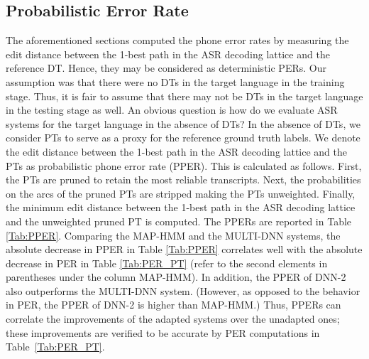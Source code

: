 \documentclass[a4paper]{article}
\begin{document}
\vspace{-1mm}
\subsection{Probabilistic Error Rate} \vspace{-1mm}
\label{sec:Probabilistic Error Rate}
The aforementioned sections computed the phone error rates by measuring the edit distance between the 1-best path in the ASR decoding lattice and the reference DT. Hence, they may be considered as deterministic PERs. Our assumption was that there were no DTs in the target language in the training stage. Thus, it is fair to assume that there may not be DTs in the target language in the testing stage as well. An obvious question is how do we evaluate ASR systems for the target language in the absence of DTs? In the absence of DTs, we consider PTs to serve as a proxy for the reference ground truth labels. We denote the edit distance between the 1-best path in the ASR decoding lattice and the PTs as probabilistic phone error rate (PPER).
This is calculated as follows. First, the PTs are pruned to retain the most reliable transcripts. Next, the probabilities on the arcs of the pruned PTs are stripped making the PTs unweighted. Finally, the minimum edit distance between the 1-best path in the ASR decoding lattice and the unweighted pruned PT is computed. The PPERs are reported in Table \ref{Tab:PPER}. Comparing the MAP-HMM and the MULTI-DNN systems, the absolute decrease in PPER in Table \ref{Tab:PPER} correlates well with the absolute decrease in PER in Table \ref{Tab:PER_PT} (refer to the second elements in parentheses under the column MAP-HMM). In addition, the PPER of DNN-2 also outperforms the MULTI-DNN system. (However, as opposed to the behavior in PER, the PPER of DNN-2 is higher than MAP-HMM.) Thus, PPERs can correlate the improvements of the adapted systems over the unadapted ones; these improvements are verified to be accurate by PER computations in Table~\ref{Tab:PER_PT}.

\end{document}
